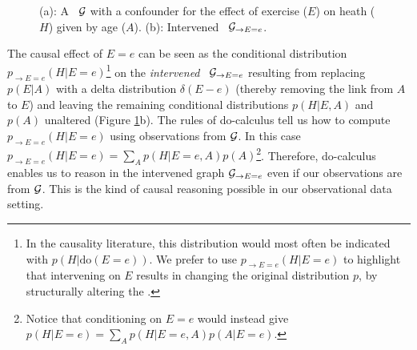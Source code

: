 \begin{figure}[t!]
\centering
{}
\hskip0.3cm
\caption{(a): A \CBN~${\cal G}$ with a confounder for the effect of exercise ($E$) on heath ($H$) given by age ($A$). 
(b): Intervened \CBN~${\cal G}_{\rightarrow E=e}$.}
\label{fig:CBN}
\end{figure}

The causal effect of $E=e$ can be seen as the conditional distribution $p_{\rightarrow E=e}(H|E=e)$\footnote{In the causality literature, this distribution would most often be indicated with $p(H|\textrm{do}(E=e))$. We prefer to use $p_{\rightarrow E=e}(H|E=e)$ to highlight that intervening on $E$ results in changing the original distribution $p$, by structurally altering the \CBN.} on the \emph{intervened} \CBN~${\cal G}_{\rightarrow E=e}$ resulting from replacing $p(E|A)$ with a delta distribution $\delta(E-e)$ (thereby removing the link from $A$ to $E$) and leaving the remaining conditional distributions $p(H|E,A)$ and $p(A)$ unaltered (Figure \ref{fig:CBN}b).
The rules of do-calculus \citep{pearl2000,pearl16causal} tell us how to compute $p_{\rightarrow E=e}(H|E=e)$ using observations from ${\cal G}$. In this case $p_{\rightarrow E=e}(H|E=e) = \sum_A p(H|E=e,A)p(A)$\footnote{Notice that conditioning on $E = e$ would instead give $p(H|E=e)=\sum_{A}p(H|E=e,A)p(A|E=e)$.}.
Therefore, do-calculus enables us to reason in the intervened graph ${\cal G}_{\rightarrow E=e}$ even if our observations are from ${\cal G}$. This is the kind of causal reasoning possible in our observational data setting.

